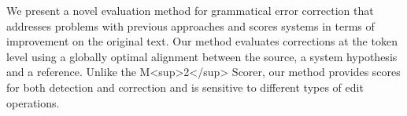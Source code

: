 We present a novel evaluation method for grammatical error correction that addresses problems with previous approaches and scores systems in terms of improvement on the original text. Our method evaluates corrections at the token level using a globally optimal alignment between the source, a system hypothesis and a reference. Unlike the M<sup>2</sup> Scorer, our method provides scores for both detection and correction and is sensitive to different types of edit operations.
